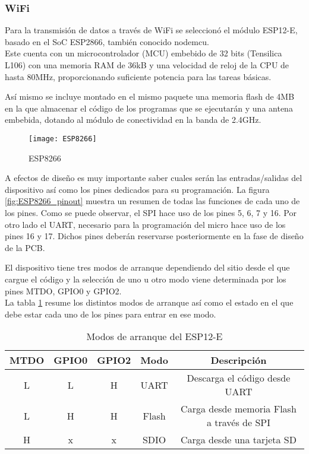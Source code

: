 \subsubsection{WiFi\label{sec:WiFi_N}}

Para la transmisión de datos a través de WiFi se seleccionó el módulo ESP12-E, basado en el \acrshort{SoC} ESP2866, también conocido nodemcu.
\\Este cuenta con un microcontrolador (\acrshort{MCU}) embebido de 32 bits (Tensilica L106) con una memoria \acrshort{RAM} de 36kB y una velocidad de reloj de la \acrshort{CPU} de hasta 80MHz, proporcionando suficiente potencia para las tareas básicas.

Así mismo se incluye montado en el mismo paquete una memoria flash de 4MB en la que almacenar el código de los programas que se ejecutarán y una antena embebida, dotando al módulo de conectividad en la banda de 2.4GHz.

\begin{figure} [h]
    \centering
    \texttt{[image: ESP8266]}
    \caption{ESP8266}
    \label{fig:ESP8266}
\end{figure}

A efectos de diseño es muy importante saber cuales serán las entradas/salidas del dispositivo así como los pines dedicados para su programación. La figura \ref{fig:ESP8266_pinout} muestra un resumen de todas las funciones de cada uno de los pines. Como se puede observar, el \acrshort{SPI} hace uso de los pines 5, 6, 7 y 16. Por otro lado el \acrshort{UART}, necesario para la programación del micro hace uso de los pines 16 y 17. Dichos pines deberán reservarse posteriormente en la fase de diseño de la \acrshort{PCB}.

El dispositivo tiene tres modos de arranque dependiendo del sitio desde el que cargue el código y la selección de uno u otro modo viene determinada por los pines MTDO, GPIO0 y GPIO2. \\La tabla \ref{tab:ESP_Boot_Modes} resume los distintos modos de arranque así como el estado en el que debe estar cada uno de los pines para entrar en ese modo.
\begin{table} [h]
 	\centering
	\begin{tabular}{|c|c|c|c|c|}
		\hline 
		MTDO & GPIO0 & GPIO2 & Modo & Descripción \\ 
		\hline 
		L & L & H & UART & Descarga el código desde UART \\ 
		\hline 
		L & H & H & Flash & Carga desde memoria Flash a través de SPI \\ 
		\hline 
		H & x & x & SDIO & Carga desde una tarjeta SD \\ 
		\hline 
	\end{tabular} 
	\caption{Modos de arranque del ESP12-E\cite{ESP_Boot_mode}}
    \label{tab:ESP_Boot_Modes}
\end{table}	

